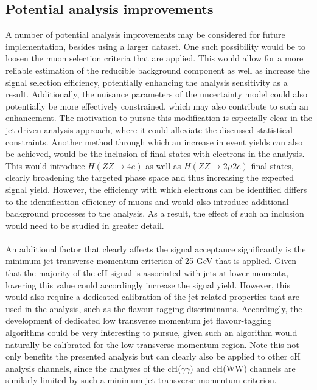 \subsection{Potential analysis improvements}
\label{sec:SMAnalysisImprovements}
A number of potential analysis improvements may be considered for future implementation, besides using a larger dataset. One such possibility would be to loosen the muon selection criteria that are applied. This would allow for a more reliable estimation of the reducible background component as well as increase the signal selection efficiency, potentially enhancing the analysis sensitivity as a result. Additionally, the nuisance parameters of the uncertainty model could also potentially be more effectively constrained, which may also contribute to such an enhancement. The motivation to pursue this modification is especially clear in the jet-driven analysis approach, where it could alleviate the discussed statistical constraints. Another method through which an increase in event yields can also be achieved, would be the inclusion of final states with electrons in the analysis. This would introduce $H(ZZ\rightarrow4e)$ as well as $H(ZZ\rightarrow2\mu2e)$ final states, clearly broadening the targeted phase space and thus increasing the expected signal yield. However, the efficiency with which electrons can be identified differs to the identification efficiency of muons and would also introduce additional background processes to the analysis. As a result, the effect of such an inclusion would need to be studied in greater detail.\\
\\
An additional factor that clearly affects the signal acceptance significantly is the minimum jet transverse momentum criterion of 25 GeV that is applied. Given that the majority of the cH signal is associated with jets at lower momenta, lowering this value could accordingly increase the signal yield. However, this would also require a dedicated calibration of the jet-related properties that are used in the analysis, such as the flavour tagging discriminants. Accordingly, the development of dedicated low transverse momentum jet flavour-tagging algorithms could be very interesting to pursue, given such an algorithm would naturally be calibrated for the low transverse momentum region. Note this not only benefits the presented analysis but can clearly also be applied to other cH analysis channels, since the analyses of the cH($\gamma\gamma)$ and cH(WW) channels are similarly limited by such a minimum jet transverse momentum criterion. \\
